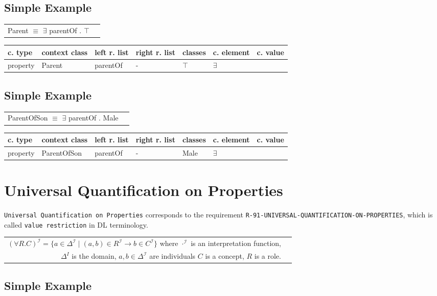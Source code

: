 \documentclass{llncs}
\newcommand{\ms}[1]{\texttt{#1}}
\newenvironment{gcotable}{
  \scriptsize
  \sffamily
  \vspace{0.3cm}
	\begin{center}
  \begin{tabular}{l|l|l|l|l|l|l}
  \hline
  \textbf{c. type} & \textbf{context class} & \textbf{left r. list} & \textbf{right r. list} & \textbf{classes} & \textbf{c. element} & \textbf{c. value} \\
  \hline

}{
  \hline
  \end{tabular}
	\end{center}
}
\newenvironment{DL}{
	\begin{center}
  \begin{tabular}{r l}

}{
  \end{tabular}
	\end{center}
}
\begin{document}
\subsection{Simple Example}

\begin{DL}
Parent $\equiv$ $\exists$ parentOf . $\top$
\end{DL}

\begin{gcotable}
property & Parent & parentOf & - & $\top$ & $\exists$ \\
\end{gcotable}

\subsection{Simple Example}

\begin{DL}
ParentOfSon $\equiv$ $\exists$ parentOf . Male
\end{DL}

\begin{gcotable}
property & ParentOfSon & parentOf & - & Male & $\exists$ \\
\end{gcotable}

\section{Universal Quantification on Properties}

\ms{Universal Quantification on Properties} corresponds to the requirement \ms{R-91-UNIVERSAL-QUANTIFICATION-ON-PROPERTIES}, which is called \ms{value restriction} in DL terminology.

\begin{center}
\begin{DL} 
$(\forall R.C)^\mathcal{I}= \{a \in \Delta^\mathcal{I}\mid (a,b) \in R^\mathcal{I} \rightarrow b \in C^\mathcal{I} \}$ where $\cdot^\mathcal{I}$ is an interpretation function, \\
$\Delta^I$ is the domain, $a,b \in \Delta^\mathcal{I}$ are individuals $C$ is a concept, $R$ is a role. 
\end{DL}
\end{center}

\subsection{Simple Example}
\end{document}
